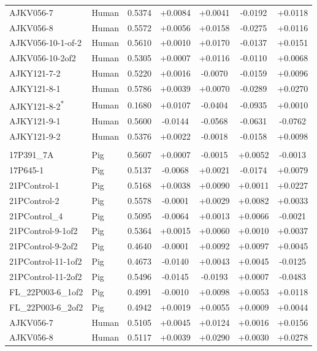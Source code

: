 \begin{longtable}{@{}ll S[table-format=1.4] *{4}{S[table-format=+1.4, retain-explicit-plus]}@{}}
AJKV056-7 & Human & 0.5374 & +0.0084 & +0.0041 & -0.0192 & +0.0118 \\
AJKV056-8 & Human & 0.5572 & +0.0056 & +0.0158 & -0.0275 & +0.0116 \\
AJKV056-10-1-of-2 & Human & 0.5610 & +0.0010 & +0.0170 & -0.0137 & +0.0151 \\
AJKV056-10-2of2 & Human & 0.5305 & +0.0007 & +0.0116 & -0.0110 & +0.0068 \\
AJKY121-7-2 & Human & 0.5220 & +0.0016 & -0.0070 & -0.0159 & +0.0096 \\
AJKY121-8-1 & Human & 0.5786 & +0.0039 & +0.0070 & -0.0289 & +0.0270 \\
AJKY121-8-2\textsuperscript{*} & Human & 0.1680 & +0.0107 & -0.0404 & -0.0935 & +0.0010 \\
AJKY121-9-1 & Human & 0.5600 & -0.0144 & -0.0568 & -0.0631 & -0.0762 \\
AJKY121-9-2 & Human & 0.5376 & +0.0022 & -0.0018 & -0.0158 & +0.0098 \\
\addlinespace
{} \\
17P391\_7A & Pig & 0.5607 & +0.0007 & -0.0015 & +0.0052 & -0.0013 \\
17P645-1 & Pig & 0.5137 & -0.0068 & +0.0021 & -0.0174 & +0.0079 \\
21PControl-1 & Pig & 0.5168 & +0.0038 & +0.0090 & +0.0011 & +0.0227 \\
21PControl-2 & Pig & 0.5578 & -0.0001 & +0.0029 & +0.0082 & +0.0033 \\
21PControl\_4 & Pig & 0.5095 & -0.0064 & +0.0013 & +0.0066 & -0.0021 \\
21PControl-9-1of2 & Pig & 0.5364 & +0.0015 & +0.0060 & +0.0010 & +0.0037 \\
21PControl-9-2of2 & Pig & 0.4640 & -0.0001 & +0.0092 & +0.0097 & +0.0045 \\
21PControl-11-1of2 & Pig & 0.4673 & -0.0140 & +0.0043 & +0.0045 & -0.0125 \\
21PControl-11-2of2 & Pig & 0.5496 & -0.0145 & -0.0193 & +0.0007 & -0.0483 \\
FL\_22P003-6\_1of2 & Pig & 0.4991 & -0.0010 & +0.0098 & +0.0053 & +0.0118 \\
FL\_22P003-6\_2of2 & Pig & 0.4942 & +0.0019 & +0.0055 & +0.0009 & +0.0044 \\
AJKV056-7 & Human & 0.5105 & +0.0045 & +0.0124 & +0.0016 & +0.0156 \\
AJKV056-8 & Human & 0.5117 & +0.0039 & +0.0290 & +0.0030 & +0.0278 \\

\end{longtable}
